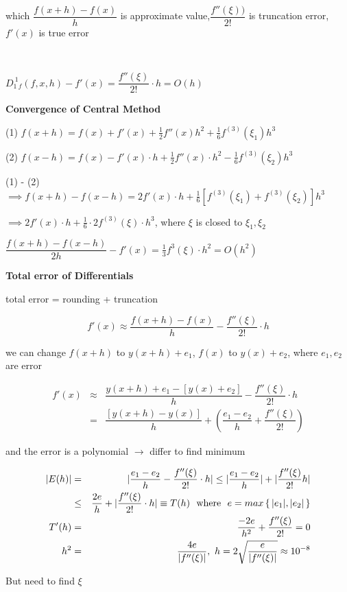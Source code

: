 which $\dfrac{f(x+h)-f(x)}{h}$ is approximate value,$\dfrac{f''(\xi))}{2!}$ is truncation error, $f'(x)$ is true error

$ $

$D_{1~f}^{~1}(f,x,h)-f'(x)=\dfrac{f''(\xi)}{2!}\cdot h = O(h)$

\textbf{Convergence of Central Method}

(1) $f(x+h) = f(x) + f'(x) + \frac{1}{2}f''(x)h^2 + \frac{1}{6}f^{(3)}(\xi_1)h^3$

(2) $f(x-h) = f(x) - f'(x)\cdot h + \frac{1}{2}f''(x)\cdot h^2 - \frac{1}{6}f^{(3)}(\xi_2)h^3$

(1) - (2) $\implies f(x+h) - f(x-h) = 2f'(x)\cdot h + \frac{1}{6}[f^{(3)}(\xi_1)+f^{(3)}(\xi_2)]h^3$

$\implies 2f'(x)\cdot h + \frac{1}{6} \cdot 2f^{(3)}(\xi)\cdot h^3$, where $\xi$ is closed to $\xi_1,\xi_2$

$\dfrac{f(x+h)-f(x-h)}{2h}-f'(x) = \frac{1}{3}f^{3}(\xi)\cdot h^2 = O(h^2)$ 


\textbf{Total error of Differentials}

total error = rounding + truncation

$$f'(x) \approx \dfrac{f(x+h)-f(x)}{h} - \dfrac{f''(\xi)}{2!}\cdot h$$

we can change $f(x+h)$ to $y(x+h) + e_1$, $f(x)$ to $y(x) + e_2$, where $e_1,e_2$ are error

\begin{eqnarray*}
	f'(x) &\approx& \dfrac{y(x+h)+e_1-[y(x)+e_2]}{h} - \dfrac{f''(\xi)}{2!}\cdot h\\
	&=&\dfrac{[y(x+h)-y(x)]}{h}+\left(\dfrac{e_1-e_2}{h}+\dfrac{f''(\xi)}{2!} \right)
\end{eqnarray*}

and the error is a polynomial $\rightarrow$ differ to find minimum

\begin{eqnarray*}
	|E(h)| &=& |\dfrac{e_1 - e_2}{h} - \dfrac{f''(\xi)}{2!}\cdot h | \leq |\dfrac{e_1-e_2}{h}| + |\dfrac{f''(\xi)}{2!}h|\\
	&\leq & \dfrac{2e}{h} + |\dfrac{f''(\xi)}{2!}\cdot h| \equiv T(h)~ \text{ where } ~e = max\left\{ \,|e_1|,|e_2| \,\right\}\\
	T'(h) &=& \dfrac{-2e}{h^2} + \dfrac{f''(\xi)}{2!} = 0\\
	h^2 &=& \dfrac{4e}{|f''(\xi)|},~h = 2\sqrt{\dfrac{e}{|f''(\xi)|}} \approx10^{-8}
\end{eqnarray*}

But need to find $\xi$ 


